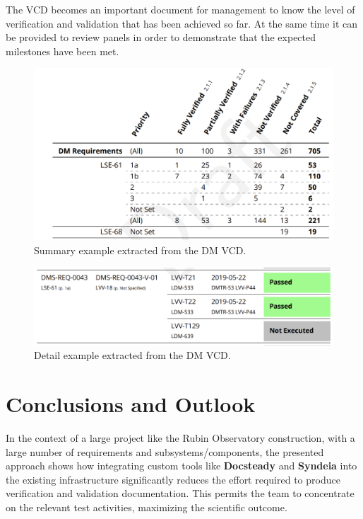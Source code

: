 The VCD becomes an important document for management to know the level of verification and validation that has been achieved so far.
At the same time it can be provided to review panels in order to demonstrate that the expected milestones have been met.

\begin{figure}
\begin{center}
\includegraphics[width=\textwidth]{imgs/VCDsumm.png}
 \caption{Summary example extracted from the DM VCD.}
 \label{fig:vcdsum}
\end{center}
\end{figure}

\begin{figure}
\begin{center}
\includegraphics[width=\textwidth]{imgs/VCDdetail.png}
 \caption{Detail example extracted from the DM VCD.}
 \label{fig:vcddetail}
\end{center}
\end{figure}

\section{Conclusions and Outlook}

In the context of a large project like the Rubin Observatory construction, with a large number of requirements 
and subsystems/components, the presented approach shows how integrating custom tools like \textbf{Docsteady} 
and \textbf{Syndeia} into the existing infrastructure significantly reduces the effort
required to produce verification and validation documentation.
This permits the team to concentrate on the relevant test activities, maximizing the scientific outcome.

